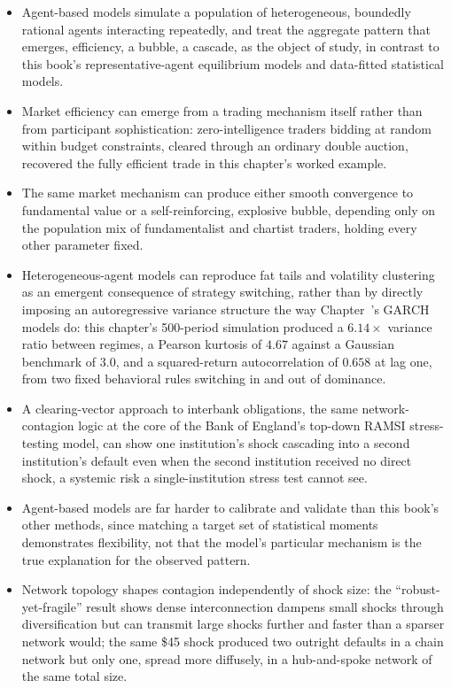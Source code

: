 \documentclass[../ai_in_finance]{subfiles}
\begin{document}
\begin{itemize}
    \item Agent-based models simulate a population of heterogeneous, boundedly rational agents interacting repeatedly, and treat the aggregate pattern that emerges, efficiency, a bubble, a cascade, as the object of study, in contrast to this book's representative-agent equilibrium models and data-fitted statistical models.
    \item Market efficiency can emerge from a trading mechanism itself rather than from participant sophistication: zero-intelligence traders bidding at random within budget constraints, cleared through an ordinary double auction, recovered the fully efficient trade in this chapter's worked example.
    \item The same market mechanism can produce either smooth convergence to fundamental value or a self-reinforcing, explosive bubble, depending only on the population mix of fundamentalist and chartist traders, holding every other parameter fixed.
    \item Heterogeneous-agent models can reproduce fat tails and volatility clustering as an emergent consequence of strategy switching, rather than by directly imposing an autoregressive variance structure the way Chapter~'s GARCH models do: this chapter's 500-period simulation produced a $6.14\times$ variance ratio between regimes, a Pearson kurtosis of $4.67$ against a Gaussian benchmark of $3.0$, and a squared-return autocorrelation of $0.658$ at lag one, from two fixed behavioral rules switching in and out of dominance.
    \item A clearing-vector approach to interbank obligations, the same network-contagion logic at the core of the Bank of England's top-down RAMSI stress-testing model, can show one institution's shock cascading into a second institution's default even when the second institution received no direct shock, a systemic risk a single-institution stress test cannot see.
    \item Agent-based models are far harder to calibrate and validate than this book's other methods, since matching a target set of statistical moments demonstrates flexibility, not that the model's particular mechanism is the true explanation for the observed pattern.
    \item Network topology shapes contagion independently of shock size: the ``robust-yet-fragile'' result shows dense interconnection dampens small shocks through diversification but can transmit large shocks further and faster than a sparser network would; the same \$45 shock produced two outright defaults in a chain network but only one, spread more diffusely, in a hub-and-spoke network of the same total size.

\end{itemize}
\end{document}
